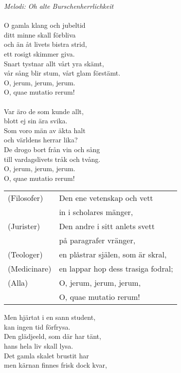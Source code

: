 {\footnotesize\textit{Melodi: Oh alte Burschenherrlichkeit}}\\
\\
O gamla klang och jubeltid\\
ditt minne skall förbliva\\
och än åt livets bistra strid,\\
ett rosigt skimmer giva.\\
Snart tystnar allt vårt yra skämt,\\
vår sång blir stum, vårt glam förstämt.\\
O, jerum, jerum, jerum.\\
O, quae mutatio rerum!\\
\\
Var äro de som kunde allt,\\
blott ej sin ära svika.\\
Som voro män av äkta halt\\
och världens herrar lika?\\
De drogo bort från vin och sång\\
till vardagslivets tråk och tvång.\\
O, jerum, jerum, jerum.\\
O, quae mutatio rerum!\\
\begin{leftborder}
\begin{tabular}{l l}
  (Filosofer)  & Den ene vetenskap och vett\\		
               & in i scholares mänger,\\
  (Jurister)   & Den andre i sitt anlets svett\\
               & på paragrafer vränger,\\
  (Teologer)   & en plåstrar själen, som är skral,\\
  (Medicinare) & en lappar hop dess trasiga fodral;\\
  (Alla)       & O, jerum, jerum, jerum,\\
               & O, quae mutatio rerum!
\end{tabular}
\end{leftborder}
\newpage
Men hjärtat i en sann student,\\
kan ingen tid förfrysa.\\
Den glädjeeld, som där har tänt,\\
hans hela liv skall lysa.\\
Det gamla skalet brustit har\\
men kärnan finnes frisk dock kvar,\\
